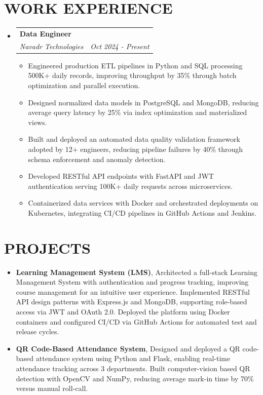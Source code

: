 \documentclass[letterpaper,11pt]{article}
\makeatletter
\newcommand{\resumeItem}[1]{\item\small{{#1 \vspace{-1pt}}}}
\newcommand{\resumeSubheading}[4]{\vspace{-2pt}\item\begin{tabular*}{1.0\textwidth}[t]{l@{\extracolsep{\fill}}r}\textbf{\large#1} & \textbf{\small #2} \\\textit{\large#3} & \textit{\small #4} \\\end{tabular*}\vspace{-7pt}}
\newcommand{\resumeSubHeadingListStart}{\begin{itemize}[leftmargin=0.0in, label={}]}
\newcommand{\resumeSubHeadingListEnd}{\end{itemize}}
\newcommand{\resumeItemListStart}{\begin{itemize}[leftmargin=0.1in]}
\newcommand{\resumeItemListEnd}{\end{itemize}\vspace{-5pt}}
\makeatother
\begin{document}
\section{\color{airforceblue}WORK EXPERIENCE}
  \resumeSubHeadingListStart
    
    \resumeSubheading{Data Engineer}{}{Navadr Technologies}{Oct 2024 - Present}
      \resumeItemListStart
        
        \resumeItem{\normalsize{Engineered production ETL pipelines in Python and SQL processing 500K+ daily records, improving throughput by 35\% through batch optimization and parallel execution.}}
        
        \resumeItem{\normalsize{Designed normalized data models in PostgreSQL and MongoDB, reducing average query latency by 25\% via index optimization and materialized views.}}
        
        \resumeItem{\normalsize{Built and deployed an automated data quality validation framework adopted by 12+ engineers, reducing pipeline failures by 40\% through schema enforcement and anomaly detection.}}
        
        \resumeItem{\normalsize{Developed RESTful API endpoints with FastAPI and JWT authentication serving 100K+ daily requests across microservices.}}
        
        \resumeItem{\normalsize{Containerized data services with Docker and orchestrated deployments on Kubernetes, integrating CI/CD pipelines in GitHub Actions and Jenkins.}}
        
      \resumeItemListEnd  
    
  \resumeSubHeadingListEnd

\section{\color{airforceblue}PROJECTS}    
    \resumeItemListStart
        
        \resumeItem{\normalsize{\textbf{Learning Management System (LMS)}, Architected a full-stack Learning Management System with authentication and progress tracking, improving course management for an intuitive user experience. Implemented RESTful API design patterns with Express.js and MongoDB, supporting role-based access via JWT and OAuth 2.0. Deployed the platform using Docker containers and configured CI/CD via GitHub Actions for automated test and release cycles.}}
        
        \resumeItem{\normalsize{\textbf{QR Code-Based Attendance System}, Designed and deployed a QR code-based attendance system using Python and Flask, enabling real-time attendance tracking across 3 departments. Built computer-vision based QR detection with OpenCV and NumPy, reducing average mark-in time by 70\% versus manual roll-call.}}
        
    \resumeItemListEnd   
\end{document}
